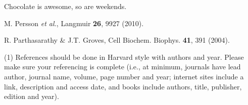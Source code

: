 \documentclass[aps,prl,reprint,10pt,amsmath,amssymb,superscriptaddress,a4paper]{revtex4-2}
\begin{document}
Chocolate is awesome, so are weekends\cite{RefNote}.

\begin{thebibliography}{99}
 M. Persson {\it et al.}, Langmuir {\bf 26}, 9927 (2010).

 R. Parthasarathy \& J.T. Groves, Cell Biochem. Biophys. {\bf 41}, 391 (2004).

 (1) References should be done in Harvard style with authors and year. Please make sure your referencing is complete (i.e., at minimum, journals have lead author, journal name, volume, page number and year; internet sites include a link, description and access date, and books include authors, title, publisher, edition and year).

\end{thebibliography}
\end{document}
